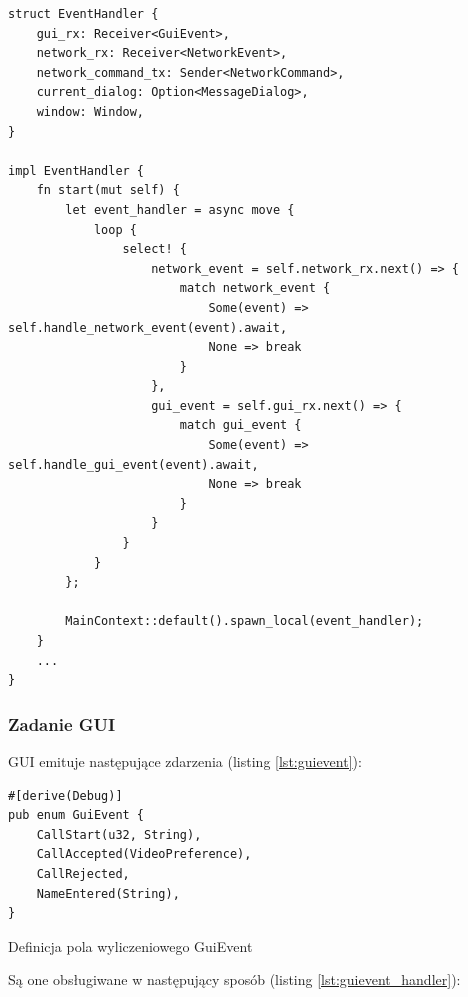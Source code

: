 \begin{verbatim}
struct EventHandler {
    gui_rx: Receiver<GuiEvent>,
    network_rx: Receiver<NetworkEvent>,
    network_command_tx: Sender<NetworkCommand>,
    current_dialog: Option<MessageDialog>,
    window: Window,
}

impl EventHandler {
    fn start(mut self) {
        let event_handler = async move {
            loop {
                select! {
                    network_event = self.network_rx.next() => {
                        match network_event {
                            Some(event) => self.handle_network_event(event).await,
                            None => break
                        }
                    },
                    gui_event = self.gui_rx.next() => {
                        match gui_event {
                            Some(event) => self.handle_gui_event(event).await,
                            None => break
                        }
                    }
                }
            }
        };

        MainContext::default().spawn_local(event_handler);
    }
    ...
}
\end{verbatim}

\subsubsection{Zadanie GUI}

GUI emituje następujące zdarzenia (listing \ref{lst:guievent}):

\begin{listing}[H]
    \begin{verbatim}
#[derive(Debug)]
pub enum GuiEvent {
    CallStart(u32, String),
    CallAccepted(VideoPreference),
    CallRejected,
    NameEntered(String),
}
\end{verbatim}
    \caption{Definicja pola wyliczeniowego GuiEvent}
    \label{lst:guievent}
\end{listing}

Są one obsługiwane w następujący sposób (listing \ref{lst:guievent_handler}):

